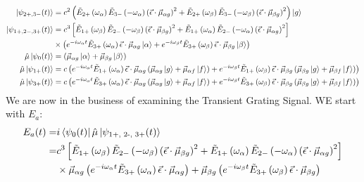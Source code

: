 \begin{align*}
	\ket{\psi_{2+,3-}(t)} &= c^2 \left( \tilde{E}_{2+} \left( \omega_{\alpha} \right)\tilde{E}_{3-} \left( -\omega_{\alpha} \right) \left( \vec{\epsilon} \cdot \vec{\mu}_{\alpha g}\right)^2  + \tilde{E}_{2+} \left( \omega_{\beta} \right) \tilde{E}_{3-} \left( -\omega_{\beta} \right) \left(\vec{\epsilon} \cdot \vec{\mu}_{\beta g} \right)^2   \right) \ket{g} \\
	\ket{\psi_{1+,2-,3+}(t)} &= c^3 \left[ \tilde{E}_{1+} \left( \omega_{\beta} \right) \tilde{E}_{2-} \left( -\omega_{\beta} \right) \left( \vec{\epsilon} \cdot \vec{\mu}_{\beta g} \right)^2 + \tilde{E}_{1+} \left( \omega_{\alpha} \right) \tilde{E}_{2-} \left( -\omega_{\alpha} \right) \left( \vec{\epsilon} \cdot \vec{\mu}_{\alpha g} \right)^2 \right] \\
	&\times \left( e^{-i \omega_{\alpha} t }\tilde{E}_{3+} \left( \omega_{\alpha} \right) \vec{\epsilon} \cdot \vec{\mu}_{\alpha g}  \ket{\alpha} + e^{-i \omega_{\beta} t }\tilde{E}_{3+} \left(  \omega_{\beta} \right) \vec{\epsilon} \cdot \vec{\mu}_{\beta g}  \ket{\beta}  \right) \\
	\hat{\mu} \ket{\psi_{0} (t)} &= \left(   \vec{\mu}_{\alpha g}  \ket{\alpha} +  \vec{\mu}_{\beta g}  \ket{\beta}  \right) \\
	\hat{\mu} \ket{\psi_{1+} (t)} &= c \left( e^{-i \omega_{\alpha} t }\tilde{E}_{1+} \left( \omega_{\alpha} \right) \vec{\epsilon} \cdot \vec{\mu}_{\alpha g}  \left( \vec{\mu}_{\alpha g}\ket{g} + \vec{\mu}_{\alpha f}\ket{f} \right) + e^{-i \omega_{\beta} t }\tilde{E}_{1+} \left( \omega_{\beta} \right) \vec{\epsilon} \cdot \vec{\mu}_{\beta g}  \left( \vec{\mu}_{\beta g}\ket{g} + \vec{\mu}_{\beta f}\ket{f} \right)  \right) \\
	\hat{\mu} \ket{\psi_{3+} (t)} &=  c \left( e^{-i \omega_{\alpha} t }\tilde{E}_{3+} \left( \omega_{\alpha} \right) \vec{\epsilon} \cdot \vec{\mu}_{\alpha g}  \left( \vec{\mu}_{\alpha g}\ket{g} + \vec{\mu}_{\alpha f}\ket{f} \right) + e^{-i \omega_{\beta} t }\tilde{E}_{3+} \left( \omega_{\beta} \right) \vec{\epsilon} \cdot \vec{\mu}_{\beta g}  \left( \vec{\mu}_{\beta g}\ket{g} + \vec{\mu}_{\beta f}\ket{f} \right)  \right)
\end{align*}
We are now in the business of examining the Transient Grating Signal.  WE start with $E_a$:
\begin{align*}
	E_a (t) =&  i \bra{\psi_{0} (t)} \hat{\mu} \ket{\psi_{\text{1+, 2-, 3+}} (t)} \\
	=& c^3 \left[ \tilde{E}_{1+} \left( \omega_{\beta} \right) \tilde{E}_{2-} \left( -\omega_{\beta} \right) \left( \vec{\epsilon} \cdot \vec{\mu}_{\beta g} \right)^2 + \tilde{E}_{1+} \left( \omega_{\alpha} \right) \tilde{E}_{2-} \left( -\omega_{\alpha} \right) \left( \vec{\epsilon} \cdot \vec{\mu}_{\alpha g} \right)^2 \right] \\
	&\times \vec{\mu}_{\alpha g}   \left( e^{-i \omega_{\alpha} t }\tilde{E}_{3+} \left( \omega_{\alpha} \right) \vec{\epsilon} \cdot \vec{\mu}_{\alpha g} \right) + \vec{\mu}_{\beta g} \left(  e^{-i \omega_{\beta} t }\tilde{E}_{3+} \left(  \omega_{\beta} \right) \vec{\epsilon} \cdot \vec{\mu}_{\beta g} \right)
\end{align*}
